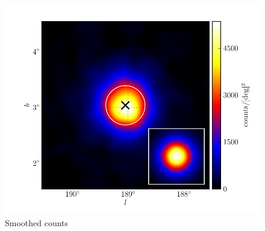 \documentclass[preprint]{aastex}
\begin{document}
\clearpage
\begin{figure}
  \begin{center}
    \includegraphics{ic443_plots/ic443_smoothed_counts.pdf}
    \caption{Smoothed counts}
    \label{smoothed_counts}
  \end{center}
\end{figure}
\end{document}
